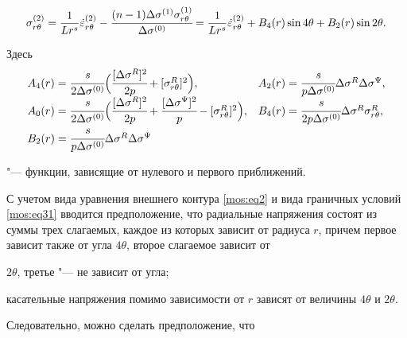 \begin{multline}

\label{mos:eq33}

\sigma^{(2)}_{r \theta}=\frac{1}{Lr^s} \dot{\varepsilon}^{(2)}_{r\theta}-\cfrac{(n-1)\Delta \sigma^{(1)}\sigma^{(1)}_{r\theta}}{\Delta \sigma^{(0)}}%

=\frac{1}{Lr^s} \dot{\varepsilon}^{(2)}_{r\theta}+B_4(r) \sin{4\theta}+B_2(r)\sin{2\theta}.

\end{multline}

Здесь\begin{multline*}

\begin{array}{ll}

A_4(r)= \cfrac{s}{2\Delta \sigma^{(0)}}\Bigl(\cfrac{[\Delta \sigma^{R}]^2}{2p}+[\sigma^{R}_{r\theta}]^2\Bigr), &

A_2(r)= \cfrac{s}{p\Delta \sigma^{(0)}} \Delta \sigma^{R}\Delta \sigma^{\Psi},

\\

A_0(r)= \cfrac{s}{2\Delta \sigma^{(0)}}\Bigl(\cfrac{[\Delta \sigma^{R}]^2}{2p}+\cfrac {[\Delta\sigma^{\Psi}]^2}{p}-[\sigma^{R}_{r\theta}]^2\Bigr), & 

B_4(r)= \cfrac{s}{2p\Delta \sigma^{(0)}}\Delta \sigma^{R}\sigma^{R}_{r\theta},\\

B_2(r)= \cfrac{s}{p\Delta \sigma^{(0)}} \Delta \sigma^{R}\Delta \sigma^{\Psi} 

\end{array}

\end{multline*}

"--- функции, зависящие от нулевого и первого приближений.



С учетом вида уравнения внешнего контура \eqref{mos:eq2} и вида граничных условий \eqref{mos:eq31} вводится предположение, что радиальные напряжения состоят из суммы трех слагаемых, каждое из которых зависит от радиуса $r$, причем  первое зависит также от угла $4\theta$, второе слагаемое зависит от

$2\theta$, третье "--- не зависит от угла; 

касательные напряжения помимо зависимости от $r$ зависят от величины  $4\theta$ и $2\theta$. 

Следовательно, можно сделать предположение, что

